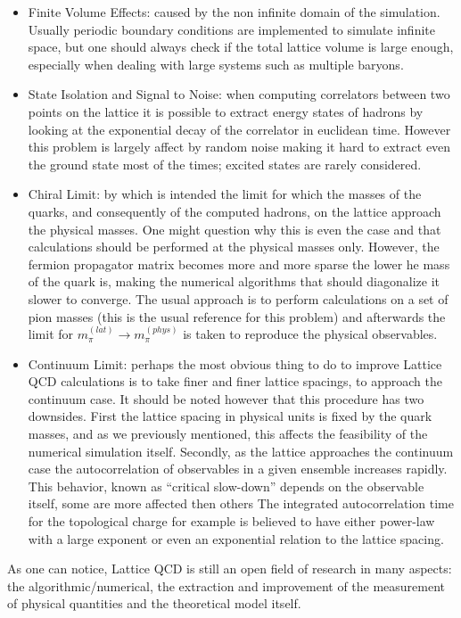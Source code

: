 \begin{itemize}
    \item Finite Volume Effects: caused by the non infinite domain of the simulation. Usually periodic boundary conditions are implemented to simulate infinite space, but one should always check if the total lattice volume is large enough, especially when dealing with large systems such as multiple baryons.
    \item State Isolation and Signal to Noise: when computing correlators between two points on the lattice it is possible to extract energy  states of hadrons by looking at the exponential decay of the correlator in euclidean time. However this problem is largely affect by random noise making it hard to extract even the ground state most of the times; excited states are rarely considered.
    \item Chiral Limit: by which is intended the limit for which the masses of the quarks, and consequently of the computed hadrons, on the lattice approach the physical masses. One might question why this is even the case and that calculations should be performed at the physical masses only. However, the fermion propagator matrix becomes more and more sparse the lower he mass of the quark is, making the numerical algorithms that should diagonalize it slower to converge. The usual approach is to perform calculations on a set of pion masses (this is the usual reference for this problem) and afterwards the limit for $m_\pi^{(lat)} \rightarrow m_\pi^{(phys)}$ is taken to reproduce the physical observables.
    \item Continuum Limit: perhaps the most obvious thing to do to improve Lattice QCD calculations is to take finer and finer lattice spacings, to approach the continuum case. It should be noted however that this procedure has two downsides. First the lattice spacing in physical units is fixed by the quark masses, and as we previously mentioned, this affects the feasibility of the numerical simulation itself. Secondly, as the lattice approaches the continuum case the autocorrelation of observables in a given ensemble increases rapidly. This behavior, known as ``critical slow-down'' depends on the observable itself, some are more affected then others  The integrated autocorrelation time for the topological charge for example is believed to have either  power-law with a large exponent or even an exponential relation to the lattice spacing. 
\end{itemize}
As one can notice, Lattice QCD is still an open field of research in many aspects: the algorithmic/numerical, the extraction and improvement of the measurement of physical quantities and the theoretical model itself. 

